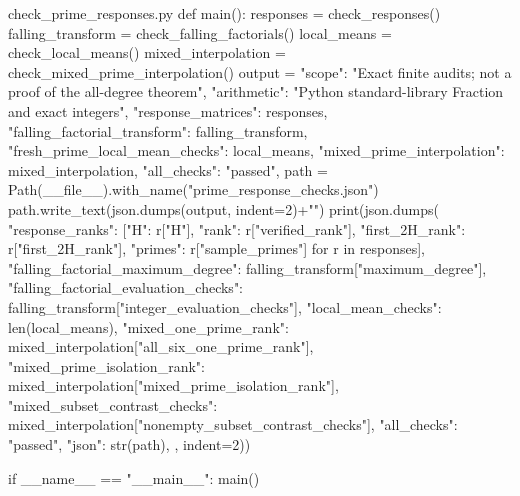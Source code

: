 \begin{filecontents*}[overwrite]{check_prime_responses.py}
def main():
    responses = check_responses()
    falling_transform = check_falling_factorials()
    local_means = check_local_means()
    mixed_interpolation = check_mixed_prime_interpolation()
    output = {
        "scope": "Exact finite audits; not a proof of the all-degree theorem",
        "arithmetic": "Python standard-library Fraction and exact integers",
        "response_matrices": responses,
        "falling_factorial_transform": falling_transform,
        "fresh_prime_local_mean_checks": local_means,
        "mixed_prime_interpolation": mixed_interpolation,
        "all_checks": "passed",
    }
    path = Path(__file__).with_name("prime_response_checks.json")
    path.write_text(json.dumps(output, indent=2)+"\n")
    print(json.dumps({
        "response_ranks": [{"H": r["H"], "rank": r["verified_rank"],
                            "first_2H_rank": r["first_2H_rank"],
                            "primes": r["sample_primes"]} for r in responses],
        "falling_factorial_maximum_degree": falling_transform["maximum_degree"],
        "falling_factorial_evaluation_checks": falling_transform["integer_evaluation_checks"],
        "local_mean_checks": len(local_means),
        "mixed_one_prime_rank": mixed_interpolation["all_six_one_prime_rank"],
        "mixed_prime_isolation_rank": mixed_interpolation["mixed_prime_isolation_rank"],
        "mixed_subset_contrast_checks": mixed_interpolation["nonempty_subset_contrast_checks"],
        "all_checks": "passed", "json": str(path),
    }, indent=2))


if __name__ == "__main__":
    main()

\end{filecontents*}
